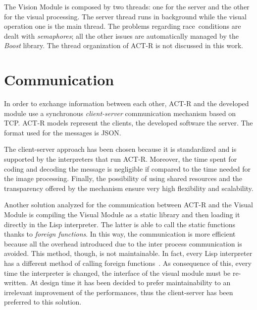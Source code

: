 	
	The Vision Module is composed by two threads: one for the server and the other for the visual processing. 
	The server thread runs in background while the visual operation one is the main thread.
	The problems regarding \mbox{race conditions} are dealt with \emph{semaphores}; all the other issues are automatically managed by the \emph{Boost} library.
	The thread organization of \mbox{ACT-R} is not discussed in this work.	


	\section{Communication}
	In order to exchange information between each other, \mbox{ACT-R} and the developed module use a synchronous \emph{client-server} communication mechanism based on \mbox{TCP}. 
	\mbox{ACT-R} models represent the clients, the developed software the server. 
	The format used for the messages is \mbox{JSON}.  		

	The client-server approach has been chosen because it is standardized and is supported by the interpreters that run \mbox{ACT-R}. 
	Moreover, the time spent for coding and decoding the message is negligible if compared to the time needed for the image processing.
	Finally, the possibility of using shared resources and the transparency offered by the mechanism ensure very high flexibility and scalability.
	

	Another solution analyzed for the communication between \mbox{ACT-R} and the Visual Module is compiling the Visual Module as a static library and then loading it directly in the \mbox{Lisp} interpreter.
	The latter is able to call the static functions thanks to \emph{foreign functions}.
	In this way, the communication is more efficient because all the overhead introduced due to the inter process communication is avoided. 
	This method, though, is not maintainable. 
	In fact, every \mbox{Lisp} interpreter has a different method of calling foreign functions~\cite{SWIGDoc}. 
	As consequence of this, every time the interpreter is changed, the interface of the visual module must be re-written.
 	At design time it has been decided to prefer maintainability to an irrelevant improvement of the performances, thus the client-server has been preferred to this solution.

